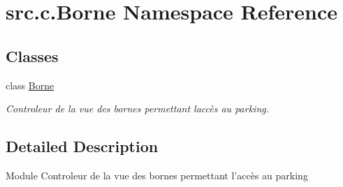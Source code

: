 \hypertarget{namespacesrc_1_1c_1_1_borne}{}\section{src.\+c.\+Borne Namespace Reference}
\label{namespacesrc_1_1c_1_1_borne}
\subsection*{Classes}
\begin{DoxyCompactItemize}
\item 
class \hyperlink{classsrc_1_1c_1_1_borne_1_1_borne}{Borne}
\begin{DoxyCompactList}\small\item\em Controleur de la vue des bornes permettant l\textquotesingle{}accès au parking. \end{DoxyCompactList}\end{DoxyCompactItemize}


\subsection{Detailed Description}
\begin{DoxyVerb}    Module Controleur de la vue des bornes permettant l'accès au parking
\end{DoxyVerb}
 